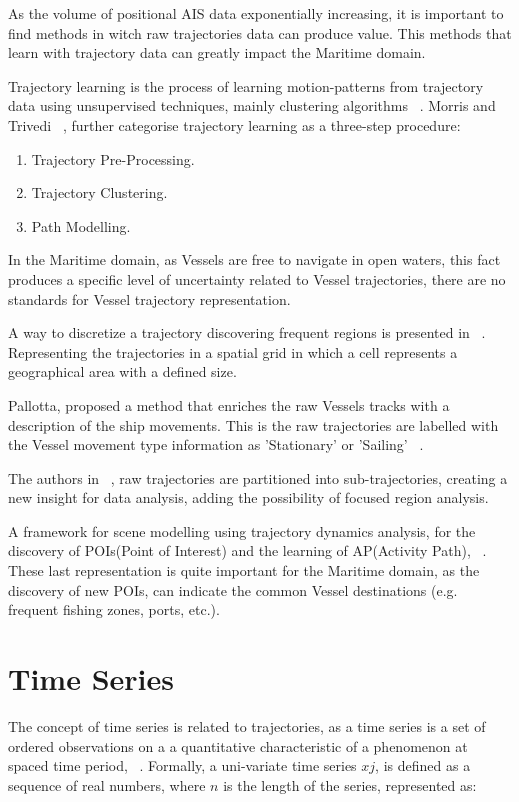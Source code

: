 As the volume of positional AIS data exponentially increasing, it is important to find methods in witch raw trajectories data can produce value. This methods that learn with trajectory data can greatly impact the Maritime domain.

Trajectory learning is the process of learning motion-patterns from trajectory data using unsupervised techniques, mainly clustering algorithms ~\cite{LeGuillarme2013}.
Morris and Trivedi ~\cite{Morris2008}, further categorise trajectory learning as a three-step procedure: 

\begin{enumerate}
\item Trajectory Pre-Processing.
\item Trajectory Clustering. 
\item Path Modelling.
\end{enumerate}

In the Maritime domain, as Vessels are free to navigate in open waters, this fact produces a specific level of uncertainty related to Vessel trajectories, there are no standards for Vessel trajectory representation.

A way to discretize a trajectory discovering frequent regions is presented in ~\cite{Lei2016}. Representing the trajectories in a spatial grid in which a cell represents a geographical area with a defined size.

Pallotta, proposed a method that enriches the raw Vessels tracks with a description of the ship movements. This is the raw trajectories are labelled with the Vessel movement type information as 'Stationary' or 'Sailing' ~\cite{Pallotta2013}.

The authors in ~\cite{Lee}, raw trajectories are partitioned into sub-trajectories, creating a new insight for data analysis, adding the possibility of focused region analysis.  

A framework for scene modelling using trajectory dynamics analysis, for the discovery of POIs(Point of Interest) and the learning of AP(Activity Path), ~\cite{Morris2008}. 
These last representation is quite important for the Maritime domain, as the discovery of new POIs, can indicate the common Vessel destinations (e.g. frequent fishing zones, ports, etc.).  

\section{Time Series}
\label{section: Time Series}
The concept of time series is related to trajectories, as a time series is a set of ordered observations on a a quantitative characteristic of a
phenomenon at spaced time period, ~\cite{Ivanovic2016b}. Formally, a uni-variate time series $xj$, is defined as a sequence of real numbers, where $n$ is the length of the series, represented as:

